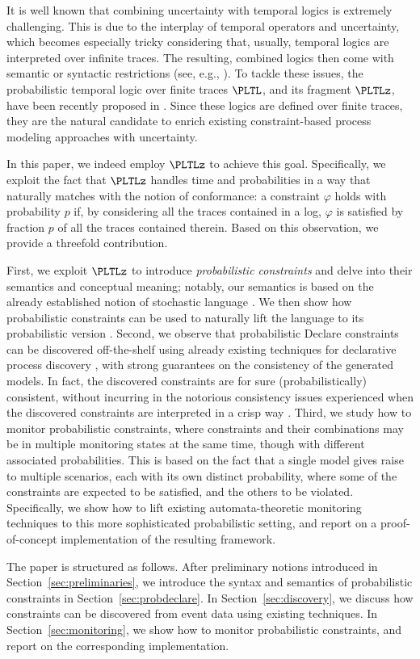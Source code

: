 It is well known that combining uncertainty with temporal logics is extremely challenging. This is due to the interplay of temporal operators and uncertainty, which becomes especially tricky considering that, usually, temporal logics are interpreted over infinite traces. The resulting, combined logics then come with semantic or syntactic restrictions (see, e.g., \cite{Ognj06,KovP18}).
To tackle these issues, the probabilistic temporal logic over finite traces $\PLTL$, and its fragment $\PLTLz$, have been recently proposed in \cite{MaMP20}. Since these logics are defined over finite traces, they are the natural candidate to enrich existing constraint-based process modeling approaches with uncertainty.

In this paper, we indeed employ $\PLTLz$ to achieve this goal.  Specifically, we exploit the fact that $\PLTLz$ handles time and probabilities in a way that naturally matches with the notion of conformance: a constraint $\varphi$ holds with probability $p$ if, by considering all the traces contained in a log, $\varphi$ is satisfied by fraction $p$ of all the traces contained therein. Based on this observation, we provide a threefold contribution.

First, we exploit $\PLTLz$ to introduce \emph{probabilistic constraints} and delve into their semantics and conceptual meaning; notably, our semantics is based on the already established notion of stochastic language \cite{DBLP:conf/bpm/LeemansSA19}. We then show how probabilistic constraints can be used to naturally lift the \declare language to its probabilistic version \pdeclare.
%
Second, we observe that probabilistic Declare constraints can be discovered off-the-shelf using already existing techniques for declarative process discovery \cite{LMMR07,MaCV12,CiccioM15,DBLP:conf/caise/SchonigRCJM16}, with strong guarantees on the consistency of the generated models. In fact, the discovered constraints are for sure (probabilistically) consistent, without incurring in the notorious consistency issues experienced when the discovered constraints are interpreted in a crisp way \cite{DMMM17}.
%
 Third, we study how to monitor probabilistic constraints,  where constraints and their combinations may be in multiple monitoring states at the same time, though with different associated probabilities. This is based on the fact that a single \pdeclare model gives raise to multiple scenarios, each with its own distinct probability, where some of the constraints are expected to be satisfied, and the others to be violated. Specifically, we show how to lift existing automata-theoretic monitoring techniques to this more sophisticated probabilistic setting, and report on a proof-of-concept implementation of the resulting framework.

The paper is structured as follows. After preliminary notions introduced in Section~\ref{sec:preliminaries}, we introduce the syntax and semantics of probabilistic constraints in Section~\ref{sec:probdeclare}. In Section~\ref{sec:discovery}, we discuss how \pdeclare constraints can be discovered from event data using existing techniques. In Section~\ref{sec:monitoring}, we show how to monitor probabilistic constraints, and report on the corresponding implementation.

